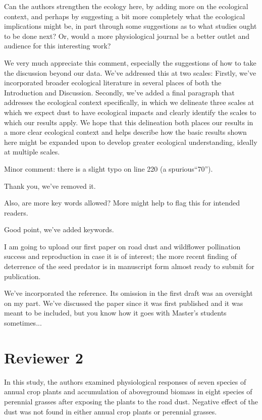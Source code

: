 \documentclass[parskip=half]{scrartcl}
\newcommand{\AR}[1]
	{\color{PineGreen}#1\color{black} \par }
\begin{document}
Can the authors strengthen the ecology here, by adding more on the ecological context, and perhaps by suggesting a bit more completely what the ecological implications might be, in part through some suggestions as to what studies ought to be done next? Or, would a more physiological journal be a better outlet and audience for this interesting work?

\AR{We very much appreciate this comment, especially the suggestions of how to take the discussion beyond our data. We've addressed this at two scales: Firstly, we've incorporated broader ecological literature in several places of both the Introduction and Discussion. Secondly, we've added a final paragraph that addresses the ecological context specifically, in which we delineate three scales at which we expect dust to have ecological impacts and clearly identify the scales to which our results apply. We hope that this delineation both places our results in a more clear ecological context and helps describe how the basic results shown here might be expanded upon to develop greater ecological understanding, ideally at multiple scales.}

Minor comment: there is a slight typo on line 220 (a spurious``70''). 

\AR{Thank you, we've removed it.}

Also, are more key words allowed? More might help to flag this for intended readers.

\AR{Good point, we've added keywords.}

I am going to upload our first paper on road dust and wildflower pollination success and reproduction in case it is of interest; the more recent finding of deterrence of the seed predator is in manuscript form almost ready to submit for publication.

\AR{We've incorporated the reference. Its omission in the first draft was an oversight on my part. We've discussed the paper since it was first published and it was meant to be included, but you know how it goes with Master's students sometimes...} 

\section*{Reviewer 2}

In this study, the authors examined physiological responses of seven species of annual crop plants and accumulation of aboveground biomass in eight species of perennial grasses after exposing the plants to the road dust. 
Negative effect of the dust was not found in either annual crop plants or perennial grasses.
\end{document}
